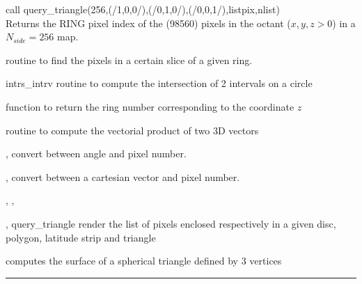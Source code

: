 \begin{example}
{
call query\_triangle(256,(/1,0,0/),(/0,1,0/),(/0,0,1/),listpix,nlist)  \\
}
{
Returns the RING pixel index of the (98560) pixels in the octant ($x,y,z>0$) in a $N_{side}=256$ map.
}
\end{example}
\begin{modules}
  \begin{sulist}{} %
 \item[\htmlref{in\_ring}{sub:in_ring}] routine to find the pixels in a certain slice of a given ring.		
 \item[intrs\_intrv] routine to compute the intersection of 2 intervals on a circle
 \item[\htmlref{ring\_num}{sub:ring_num}] function to return the ring number corresponding to the coordinate $z$
 \item[\htmlref{vect\_prod}{sub:vect_prod}] routine to compute the vectorial product of two 3D vectors
  \end{sulist}
\end{modules}

\begin{related}
  \begin{sulist}{} %
  \item[\htmlref{pix2ang}{sub:pix_tools}, \htmlref{ang2pix}{sub:pix_tools}] convert between angle and pixel number.
  \item[\htmlref{pix2vec}{sub:pix_tools}, \htmlref{vec2pix}{sub:pix_tools}] convert between a cartesian vector and pixel number.
  \item[\htmlref{query\_disc}{sub:query_disc}, \htmlref{query\_polygon}{sub:query_polygon},]
  \item[\htmlref{query\_strip}{sub:query_strip}, query\_triangle] render the list of pixels enclosed
  respectively in a given disc, polygon, latitude strip and triangle
  \item[\htmlref{surface\_triangle}{sub:surface_triangle}] computes the surface of a spherical triangle defined by 3 vertices

  \end{sulist}
\end{related}

\rule{\hsize}{2mm}

\newpage
